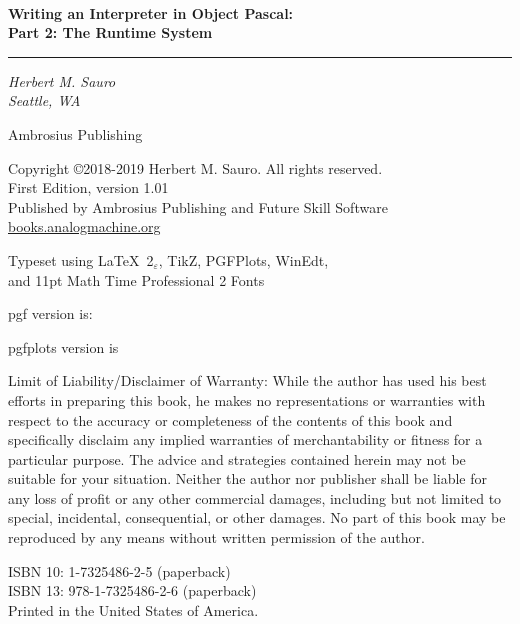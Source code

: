 \documentclass[11pt,twosided]{book}
\begin{document}
\frontmatter

\thispagestyle{empty}

\begin{center}
\textbf{\sffamily\Large \phantom{Ix}}\\
\textbf{\sffamily\Large Writing an Interpreter in Object Pascal:\\[6pt]\large Part 2: The Runtime System}
\rule{\linewidth}{0.5mm}
\end{center}

\vspace{0.7in}

\begin{center}
{\em\hfill Herbert M. Sauro}\\
{\em\hfill Seattle, WA}

\vfill

\begin{center}  \end{center}
\vskip-20pt
{\Large Ambrosius Publishing}
\end{center}

\newpage
\thispagestyle{empty} {\normalsize Copyright \copyright{2018-2019} Herbert M. Sauro. All rights reserved.\\
First Edition, version 1.01 \\
Published by Ambrosius Publishing and Future Skill Software\\
\url{books.analogmachine.org}

\vskip5pt

Typeset using \LaTeX\ 2$_\varepsilon$, TikZ, PGFPlots, WinEdt,\\
and 11pt Math Time Professional 2 Fonts
\vskip10pt

pgf version is: \pgfversion

pgfplots version is \pgfplotsversion

{\small Limit of Liability/Disclaimer of Warranty: While the author has used his best efforts in preparing this book, he makes no representations or warranties with respect to the accuracy or completeness of the contents of this book and specifically disclaim any implied warranties of merchantability or fitness for a particular purpose.  The advice and strategies contained herein may not be suitable for your situation. Neither the author nor publisher shall be liable for any loss of profit or any other commercial damages, including but not limited to special, incidental, consequential, or other damages. No part of this book may be reproduced by any means without written permission of the author.} \vskip6pt

ISBN 10: 1-7325486-2-5 (paperback) \\
ISBN 13: 978-1-7325486-2-6 (paperback) \\
\vskip-6pt
Printed in the United States of America.\\
}
\end{document}
